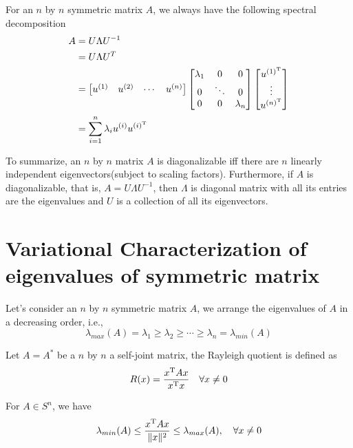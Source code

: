 \begin{theorem}  For an $n$ by $n$ symmetric matrix $A$, we always have the following spectral decomposition
\begin{align*}
A &= U\Lambda U^{-1}\\
&= U\Lambda U^{T}\\
&= 
\begin{bmatrix}
u^{(1)} & u^{(2)} & \cdots & u^{(n)}\\
\end{bmatrix}
\begin{bmatrix}
\lambda_1 & 0 & 0\\
0 & \ddots & 0\\
0 & 0 & \lambda_n
\end{bmatrix}
\begin{bmatrix}
u^{(1)^{{\rm T}}}\\
\vdots\\
u^{(n)^{{\rm T}}}
\end{bmatrix}\\
&= \sum^n_{i=1}\lambda_iu^{(i)}u^{(i)^{{\rm T}}}
\end{align*}

\end{theorem}
To summarize, an $n$ by $n$ matrix $A$ is diagonalizable iff there are $n$ linearly independent eigenvectors(subject to scaling factors). Furthermore, if $A$ is diagonalizable, that is, $A = U\Lambda U^{-1}$, then $\Lambda$ is diagonal matrix with all its entries are the eigenvalues and $U$ is a collection of all its eigenvectors. 



\section{Variational Characterization of eigenvalues of symmetric matrix} 

Let's consider an $n$ by $n$ symmetric matrix $A$, we arrange the eigenvalues of $A$ in a decreasing order, i.e.,
$$\lambda_{max}(A) = \lambda_1 \geq \lambda_2 \geq \cdots \geq \lambda_n =\lambda_{min}(A)$$

\begin{definition} Let $A=A^*$ be a $n$ by $n$ a self-joint matrix, the Rayleigh quotient is defined as 
$$R(x)= \frac{x^{{\rm T}}Ax}{x^{{\rm T}}x}\quad  \forall x\neq 0$$
\end{definition}


\begin{theorem}
For $A\in S^n$, we have 
$$\lambda_{min}(A) \leq \frac{x^{{\rm T}}Ax}{\Vert x\Vert^2}\leq \lambda_{max}(A),\quad \forall x \neq 0$$
\end{theorem}


